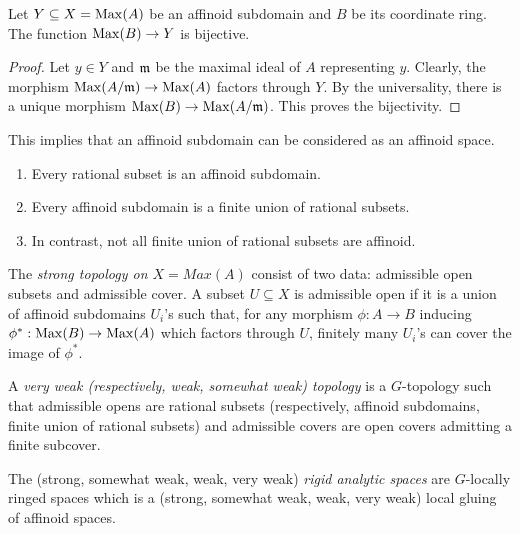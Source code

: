 \documentclass{amsart}
\begin{document}
\begin{prop}
    Let $Y \subseteq X = \operatorname{Max}(A)$ be an affinoid subdomain and $B$ be its coordinate ring. The function $\operatorname{Max}(B) \to Y$ is bijective.
\end{prop}

\begin{proof}
    Let $y \in Y$ and $\mathfrak{m}$ be the maximal ideal of $A$ representing $y$. Clearly, the morphism $\operatorname{Max}(A/\mathfrak{m}) \to \operatorname{Max}(A)$ factors through $Y$. By the universality, there is a unique morphism $\operatorname{Max}(B) \to \operatorname{Max}(A/\mathfrak{m})$. This proves the bijectivity.
\end{proof}

This implies that an affinoid subdomain can be considered as an affinoid space.

\begin{fact}
    \begin{enumerate}
        \item Every rational subset is an affinoid subdomain.
        
        \item Every affinoid subdomain is a finite union of rational subsets.

        \item In contrast, not all finite union of rational subsets are affinoid.
    \end{enumerate}
\end{fact}

\begin{defn}
    The \textit{strong topology on $X = Max(A)$} consist of two data: admissible open subsets and admissible cover. A subset $U \subseteq X$ is admissible open if it is a union of affinoid subdomains $U_i$'s such that, for any morphism $\phi: A \to B$ inducing $\phi^{\ast}: \operatorname{Max}(B) \to \operatorname{Max}(A)$ which factors through $U$, finitely many $U_i$'s can cover the image of $\phi^{\ast}$.
\end{defn}

\begin{defn}
    A \textit{very weak (respectively, weak, somewhat weak) topology} is a $G$-topology such that admissible opens are rational subsets (respectively, affinoid subdomains, finite union of rational subsets) and admissible covers are open covers admitting a finite subcover.
\end{defn}

\begin{defn}
    The (strong, somewhat weak, weak, very weak) \textit{rigid analytic spaces} are $G$-locally ringed spaces which is a (strong, somewhat weak, weak, very weak) local gluing of affinoid spaces.
\end{defn}
\end{document}
